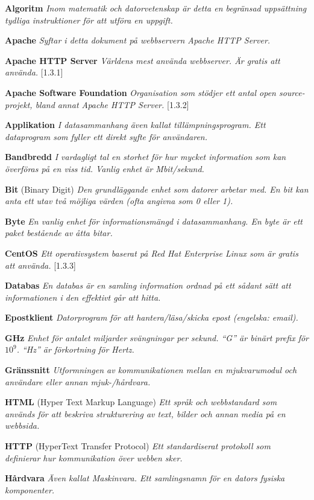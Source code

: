 \documentclass[a4paper, twoside, 11pt, titlepage]{article}
\begin{document}
	\textbf{Algoritm} \emph{Inom matematik och datorvetenskap är detta en begränsad uppsättning tydliga instruktioner för att utföra en uppgift.}

	\textbf{Apache} \emph{Syftar i detta dokument på webbservern  Apache HTTP Server.}

	\textbf{Apache HTTP Server} \emph{Världens mest använda webbserver. Är gratis att använda.} [1.3.1]

	\textbf{Apache Software Foundation} \emph{Organisation som stödjer ett antal open source-projekt, bland annat Apache HTTP Server.} [1.3.2]

	\textbf{Applikation} \emph{I datasammanhang även kallat tillämpningsprogram. Ett dataprogram som fyller ett direkt syfte för användaren.}

	\textbf{Bandbredd} \emph{I vardagligt tal en storhet för hur mycket information som kan överföras på en viss tid. Vanlig enhet är Mbit/sekund.}

	\textbf{Bit} (Binary Digit) \emph{Den grundläggande enhet som datorer arbetar med. En bit kan anta ett utav två möjliga värden (ofta angivna som 0 eller 1).}

	\textbf{Byte} \emph{En vanlig enhet för informationsmängd i datasammanhang. En byte är ett paket bestående av åtta bitar.}

	\textbf{CentOS} \emph{Ett operativsystem baserat på Red Hat Enterprise Linux som är gratis att använda.} [1.3.3]

	\textbf{Databas} \emph{En databas är en samling information ordnad på ett sådant sätt att informationen i den effektivt går att hitta.}

	\textbf{Epostklient} \emph{Datorprogram för att hantera/läsa/skicka epost (engelska: email).}

	\textbf{GHz} \emph{Enhet för antalet miljarder svängningar per sekund. ``G'' är binärt prefix för $10^{9}$. ``Hz'' är förkortning för Hertz.}

	\textbf{Gränssnitt} \emph{Utformningen av kommunikationen mellan en mjukvarumodul och användare eller annan mjuk-/hårdvara.}

	\textbf{HTML} (Hyper Text Markup Language) \emph{Ett språk och webbstandard som används för att beskriva strukturering av text, bilder och annan media på en webbsida.}

	\textbf{HTTP} (HyperText Transfer Protocol) \emph{Ett standardiserat protokoll som definierar hur kommunikation över webben sker.}

	\textbf{Hårdvara} \emph{Även kallat Maskinvara. Ett samlingsnamn för en dators fysiska komponenter.}
\end{document}
